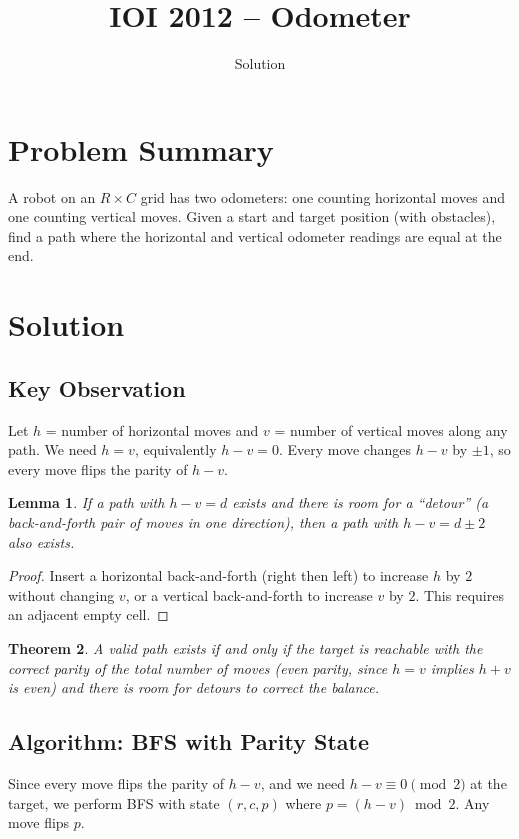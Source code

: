\documentclass[11pt,a4paper]{article}
\title{IOI 2012 -- Odometer}
\author{Solution}
\date{}
\newtheorem{theorem}{Theorem}
\newtheorem{lemma}[theorem]{Lemma}
\begin{document}
\maketitle

\section{Problem Summary}
A robot on an $R \times C$ grid has two odometers: one counting horizontal moves and one counting vertical moves. Given a start and target position (with obstacles), find a path where the horizontal and vertical odometer readings are equal at the end.

\section{Solution}

\subsection{Key Observation}
Let $h$ = number of horizontal moves and $v$ = number of vertical moves along any path. We need $h = v$, equivalently $h - v = 0$. Every move changes $h - v$ by $\pm 1$, so every move flips the parity of $h - v$.

\begin{lemma}
If a path with $h - v = d$ exists and there is room for a ``detour'' (a back-and-forth pair of moves in one direction), then a path with $h - v = d \pm 2$ also exists.
\end{lemma}
\begin{proof}
Insert a horizontal back-and-forth (right then left) to increase $h$ by $2$ without changing $v$, or a vertical back-and-forth to increase $v$ by $2$. This requires an adjacent empty cell.
\end{proof}

\begin{theorem}
A valid path exists if and only if the target is reachable with the correct parity of the total number of moves (even parity, since $h = v$ implies $h + v$ is even) and there is room for detours to correct the balance.
\end{theorem}

\subsection{Algorithm: BFS with Parity State}
Since every move flips the parity of $h - v$, and we need $h - v \equiv 0 \pmod{2}$ at the target, we perform BFS with state $(r, c, p)$ where $p = (h - v) \bmod 2$. Any move flips $p$.
\end{document}
